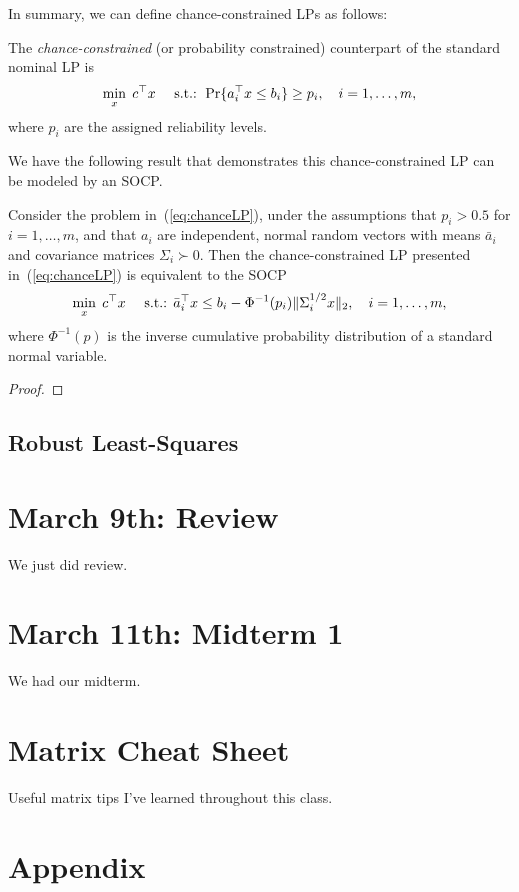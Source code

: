 \documentclass[11 pt]{scrartcl}
\begin{document}
In summary, we can define chance-constrained LPs as follows: 
\begin{definition}
    The \emph{chance-constrained} (or probability constrained) counterpart of the standard nominal LP is 
    \begin{align}
    \min_x\; c^\top x \quad\text{ s.t.: } \Pr\{a_i^\top x \leq b_i\} \geq p_i, \quad i = 1,\dots, m,
    \label{eq:chanceLP}
    \end{align}
where $p_i$ are the assigned reliability levels. 
\end{definition}

We have the following result that demonstrates this chance-constrained LP can be modeled by an SOCP. 

\begin{theorem}
    Consider the problem in~(\ref{eq:chanceLP}), under the assumptions that $p_i > 0.5$ for $i = 1,\dots, m$, and that $a_i$ are independent, normal random vectors with means $\bar{a}_i$ and covariance matrices $\Sigma_i \succ 0$. 
    Then the chance-constrained LP presented in~(\ref{eq:chanceLP}) is equivalent to the SOCP 
    \begin{align*}
        \min_x\; c^\top x\quad \text{ s.t.: } \bar{a}_i^\top x \leq b_i - \Phi^{-1}(p_i) \|\Sigma_i^{1/2} x\|_2,\quad i = 1,\dots, m,
    \end{align*}
    where $\Phi^{-1}(p)$ is the inverse cumulative probability distribution of a standard normal variable.
\end{theorem}

\begin{proof}

\end{proof}

\subsection{Robust Least-Squares}

\section{March 9th: Review}
We just did review. 

\section{March 11th: Midterm 1}
We had our midterm. 

\newpage
\section{Matrix Cheat Sheet}
Useful matrix tips I've learned throughout this class. 


\section{Appendix}
\renewcommand{\listtheoremname}{List of Definitions and Theorems}
\listoftheorems[ignoreall,show={theorem,definition}]

\listoftodos
\end{document}
